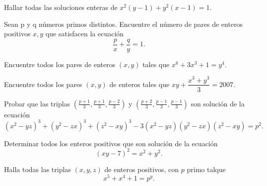 \begin{exercise}
    Hallar todas las soluciones enteras de $x^2(y - 1) + y^2(x - 1) = 1$.
\end{exercise}

\begin{exercise}
    Sean p y q números primos distintos.
    Encuentre el número de pares de enteros positivos $x, y$ que satisfacen la ecuación
    \[
        \frac{p}{x} + \frac{q}{y} = 1.
    \]
\end{exercise}

\begin{problem}
    Encuentre todos los pares de enteros $(x, y)$ tales que $x^6 + 3x^3 + 1 = y^4$.
\end{problem}

\begin{problem}
    Encuentre todos los pares $(x, y)$ de enteros tales que $xy + \dfrac{x^3+ y^3}{3} = 2007$.
\end{problem}

\begin{exercise}
    Probar que las triplas $\left(\frac{p + 1}{3}, \frac{p + 1}{3}, \frac{p - 2}{3}\right)$ y $\left(\frac{p + 2}{3}, \frac{p - 1}{3}, \frac{p - 1}{3}\right)$ son
    solución de la ecuación
    \[
        (x^2 - yz)^3 + (y^2 - zx)^3 + (z^2 - xy)^3 - 3(x^2 - yz)(y^2 - zx)(z^2 - xy) = p^2.
    \]
\end{exercise}

\begin{exercise}
    Determinar todos los enteros positivos que son solución de la ecuación
    \[
        (xy - 7)^2 = x^2 + y^2.
    \]
\end{exercise}

\begin{problem}
    Halla todas las triplas $(x, y, z)$ de enteros positivos, con $p$ primo talque
    \[
        x^5 + x^4 +1= p^y.
    \]
\end{problem}